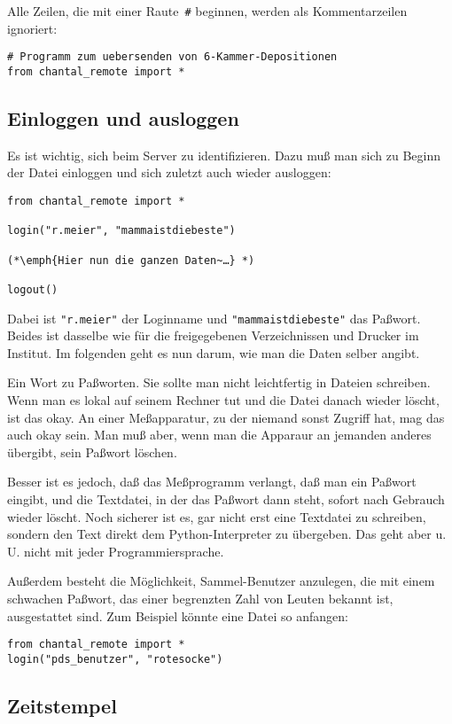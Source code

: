 \documentclass[german,11pt]{article}
\begin{document}
Alle Zeilen, die mit einer Raute~\lstinline{#} beginnen, werden als
Kommentarzeilen ignoriert:
\begin{lstlisting}
# Programm zum uebersenden von 6-Kammer-Depositionen
from chantal_remote import *
\end{lstlisting}


\subsection{Einloggen und ausloggen}

Es ist wichtig, sich beim Server zu identifizieren.  Dazu muß man sich zu
Beginn der Datei einloggen und sich zuletzt auch wieder ausloggen:
\begin{lstlisting}
from chantal_remote import *

login("r.meier", "mammaistdiebeste")

(*\emph{Hier nun die ganzen Daten~…} *)

logout()
\end{lstlisting}
Dabei ist \lstinline{"r.meier"} der Loginname und
\lstinline{"mammaistdiebeste"} das Paßwort.  Beides ist dasselbe wie für die
freigegebenen Verzeichnissen und Drucker im Institut.  Im folgenden geht es nun
darum, wie man die Daten selber angibt.

Ein Wort zu Paßworten.  Sie sollte man nicht leichtfertig in Dateien
schreiben.  Wenn man es lokal auf seinem Rechner tut und die Datei danach
wieder löscht, ist das okay.  An einer Meßapparatur, zu der niemand sonst
Zugriff hat, mag das auch okay sein.  Man muß aber, wenn man die Apparaur an
jemanden anderes übergibt, sein Paßwort löschen.

Besser ist es jedoch, daß das Meßprogramm verlangt, daß man ein Paßwort
eingibt, und die Textdatei, in der das Paßwort dann steht, sofort nach Gebrauch
wieder löscht.  Noch sicherer ist es, gar nicht erst eine Textdatei zu
schreiben, sondern den Text direkt dem Python-Interpreter zu übergeben.  Das
geht aber u.\,U. nicht mit jeder Programmiersprache.

Außerdem besteht die Möglichkeit, Sammel-Benutzer anzulegen, die mit einem
schwachen Paßwort, das einer begrenzten Zahl von Leuten bekannt ist,
ausgestattet sind.  Zum Beispiel könnte eine Datei so anfangen:
\begin{lstlisting}
from chantal_remote import *
login("pds_benutzer", "rotesocke")
\end{lstlisting}


\subsection{Zeitstempel}
\end{document}

